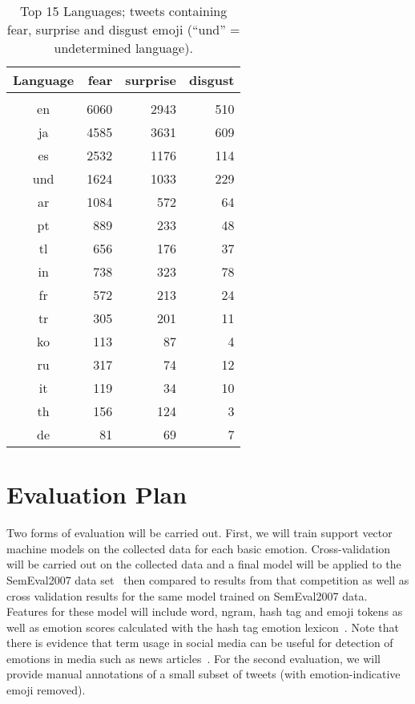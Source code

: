 \documentclass[10pt, a4paper]{article}
\begin{document}
\begin{table}
	\begin{tabular}{crrr}
Language & fear & surprise & disgust \\
	\hline \\
en & 6060 & 2943 & 510 \\
ja & 4585 & 3631 & 609 \\
es & 2532 & 1176 & 114 \\
und & 1624 & 1033 & 229 \\
ar & 1084 & 572 & 64 \\
pt & 889 & 233 & 48 \\
tl & 656 & 176 & 37 \\
in & 738 & 323 & 78 \\
fr & 572 & 213 & 24 \\
tr & 305 & 201 & 11 \\
ko & 113 & 87 & 4 \\
ru & 317 & 74 & 12 \\
it & 119 & 34 & 10 \\
th & 156 & 124 & 3 \\
de & 81 & 69 & 7 \\
	\end{tabular}
	\caption{Top 15 Languages; tweets containing fear, surprise and disgust emoji (``und'' = undetermined language).}
	\label{tbl:top-ten-langs-2}
\end{table}

\section{Evaluation Plan}
Two forms of evaluation will be carried out. First, we will train support vector machine models on the collected data for each basic emotion. 
Cross-validation will be carried out on the collected data and a final model will be applied to the SemEval2007 data set~\cite{Strapparava2007Semeval2007} then compared to results from that competition as well as cross validation results for the same model trained on SemEval2007 data.
Features for these model will include word, ngram, hash tag and emoji tokens as well as emotion scores calculated with the hash tag emotion lexicon~\cite{Mohammad2012Emotional}. Note that there is evidence that term usage in social media can be useful for detection of emotions in media such as news articles~\cite{Mohammad2012Emotional}.
For the second evaluation, we will provide manual annotations of a small subset of tweets (with emotion-indicative emoji removed).
\end{document}
